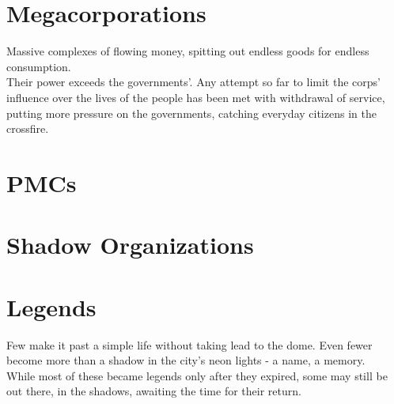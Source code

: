 \documentclass[11pt,a4paper,openany,dvipsnames]{book}
\begin{document}
	
	
	\chapter{Megacorporations}
	Massive complexes of flowing money, spitting out endless goods for endless consumption.
	\\%
	Their power exceeds the governments'.
	Any attempt so far to limit the corps' influence over the lives of the people has been met with withdrawal of service, putting more pressure on the governments, catching everyday citizens in the crossfire.
	
	
	\chapter{PMCs}
	
	
	
	\chapter{Shadow Organizations}
	
	
	\chapter{Legends}
	Few make it past a simple life without taking lead to the dome.
	Even fewer become more than a shadow in the city's neon lights - a name, a memory.
	\\%
	While most of these became legends only after they expired, some may still be out there, in the shadows, awaiting the time for their return.
	
\end{document}
